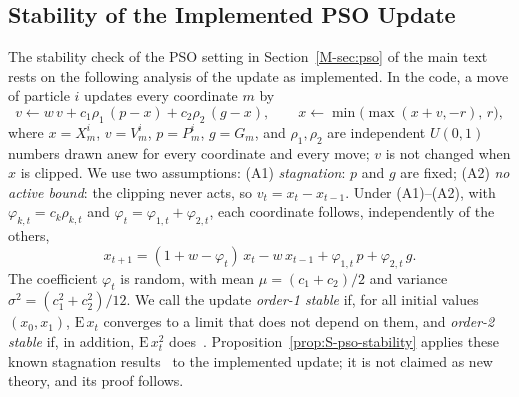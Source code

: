 \subsection{Stability of the Implemented PSO Update}
\label{sec:S-th-pso}
The stability check of the PSO setting in Section~\ref{M-sec:pso} of the main text rests on the following analysis of the update as implemented. In the code, a move of particle $i$ updates every coordinate $m$ by
\begin{equation}
v\leftarrow w\,v+c_1\rho_1\,(p-x)+c_2\rho_2\,(g-x),\qquad x\leftarrow \min\bigl(\max(x+v,-r),\,r\bigr),
\label{eq:S-th-upd}
\end{equation}
where $x=X^i_m$, $v=V^i_m$, $p=P^i_m$, $g=G_m$, and $\rho_1,\rho_2$ are independent $U(0,1)$ numbers drawn anew for every coordinate and every move; $v$ is not changed when $x$ is clipped. We use two assumptions: (A1) \emph{stagnation}: $p$ and $g$ are fixed; (A2) \emph{no active bound}: the clipping never acts, so $v_t=x_t-x_{t-1}$. Under (A1)--(A2), with $\varphi_{k,t}=c_k\rho_{k,t}$ and $\varphi_t=\varphi_{1,t}+\varphi_{2,t}$, each coordinate follows, independently of the others,
\begin{equation}
x_{t+1}=(1+w-\varphi_t)\,x_t-w\,x_{t-1}+\varphi_{1,t}\,p+\varphi_{2,t}\,g .
\label{eq:S-th-rec}
\end{equation}
The coefficient $\varphi_t$ is random, with mean $\mu=(c_1+c_2)/2$ and variance $\sigma^2=(c_1^2+c_2^2)/12$. We call the update \emph{order-1 stable} if, for all initial values $(x_0,x_1)$, $\mathrm E\,x_t$ converges to a limit that does not depend on them, and \emph{order-2 stable} if, in addition, $\mathrm E\,x_t^2$ does~\cite{Poli2009}. Proposition~\ref{prop:S-pso-stability} applies these known stagnation results~\cite{Poli2009} to the implemented update; it is not claimed as new theory, and its proof follows.

